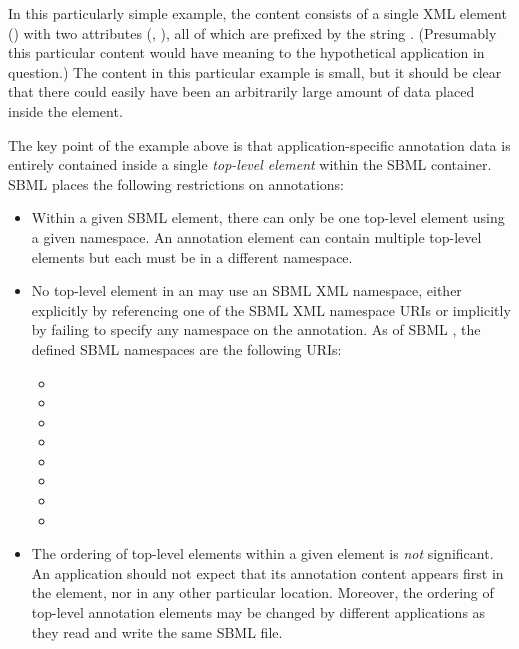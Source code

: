 In this particularly simple example, the content consists of a single
XML element () with two attributes
(, ), all of which are prefixed by
the string .  (Presumably this particular content
would have meaning to the hypothetical application in question.)
The content in this particular example is small, but it should be
clear that there could easily have been an arbitrarily large
amount of data placed inside the  element.

The key point of the example above is that application-specific
annotation data is entirely contained inside a single
\emph{top-level element} within the SBML 
container.  SBML \thisLV places the following
restrictions on annotations:
\begin{itemize}

\item Within a given SBML  element, there can
  only be one top-level element using a given namespace.  An
  annotation element can contain multiple top-level elements but
  each must be in a different namespace.

\item No top-level element in an  may use an
  SBML XML namespace, either explicitly by referencing one of the
  SBML XML namespace URIs or implicitly by failing to specify any
  namespace on the annotation.  As of SBML \thisLV, the
    defined SBML namespaces are the following URIs:\\[-1.5ex]
  \begin{itemize}\setlength{\parskip}{-0.5ex}
  \item {}
  \item {}
  \item {}
  \item {}
  \item {}
  \item {}
  \item {}
  \item {}
  \end{itemize}
  
\item The ordering of top-level elements within a given
   element is \emph{not} significant.  An
  application should not expect that its annotation content
  appears first in the  element, nor in any
  other particular location.  Moreover, the ordering of
    top-level annotation elements may be changed by
  different applications as they read and write the same
    SBML file.

\end{itemize}

